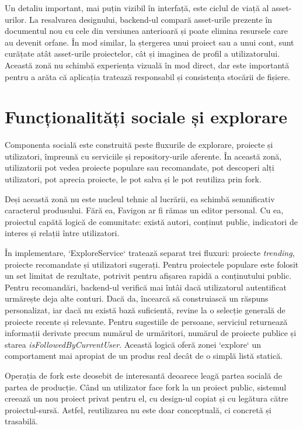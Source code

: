 Un detaliu important, mai puțin vizibil în interfață, este ciclul de viață al asset-urilor. La resalvarea designului, backend-ul compară asset-urile prezente în documentul nou cu cele din versiunea anterioară și poate elimina resursele care au devenit orfane. În mod similar, la ștergerea unui proiect sau a unui cont, sunt curățate atât asset-urile proiectelor, cât și imaginea de profil a utilizatorului. Această zonă nu schimbă experiența vizuală în mod direct, dar este importantă pentru a arăta că aplicația tratează responsabil și consistența stocării de fișiere.

\section{Funcționalități sociale și explorare}

Componenta socială este construită peste fluxurile de explorare, proiecte și utilizatori, împreună cu serviciile și repository-urile aferente. În această zonă, utilizatorii pot vedea proiecte populare sau recomandate, pot descoperi alți utilizatori, pot aprecia proiecte, le pot salva și le pot reutiliza prin fork.

Deși această zonă nu este nucleul tehnic al lucrării, ea schimbă semnificativ caracterul produsului. Fără ea, Favigon ar fi rămas un editor personal. Cu ea, proiectul capătă logică de comunitate: există autori, conținut public, indicatori de interes și relații între utilizatori.

În implementare, `ExploreService` tratează separat trei fluxuri: proiecte \textit{trending}, proiecte recomandate și utilizatori sugerați. Pentru proiectele populare este folosit un set limitat de rezultate, potrivit pentru afișarea rapidă a conținutului public. Pentru recomandări, backend-ul verifică mai întâi dacă utilizatorul autentificat urmărește deja alte conturi. Dacă da, încearcă să construiască un răspuns personalizat, iar dacă nu există bază suficientă, revine la o selecție generală de proiecte recente și relevante. Pentru sugestiile de persoane, serviciul returnează informații derivate precum numărul de urmăritori, numărul de proiecte publice și starea \textit{isFollowedByCurrentUser}. Această logică oferă zonei `explore` un comportament mai apropiat de un produs real decât de o simplă listă statică.

Operația de fork este deosebit de interesantă deoarece leagă partea socială de partea de producție. Când un utilizator face fork la un proiect public, sistemul creează un nou proiect privat pentru el, cu design-ul copiat și cu legătura către proiectul-sursă. Astfel, reutilizarea nu este doar conceptuală, ci concretă și trasabilă.

